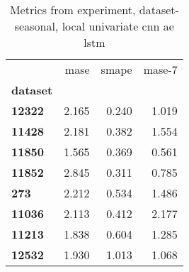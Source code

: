 \begin{table}[h]
\centering
\caption{Metrics from experiment, dataset-seasonal, local univariate cnn ae lstm}
\label{table:local-univariate-cnn-ae-lstm-dataset-seasonal}
\begin{tabular}{lrrr}
\toprule
{} &   mase &  smape &  mase-7 \\
\textbf{dataset} &        &        &         \\
\midrule
\textbf{12322  } &  2.165 &  0.240 &   1.019 \\
\textbf{11428  } &  2.181 &  0.382 &   1.554 \\
\textbf{11850  } &  1.565 &  0.369 &   0.561 \\
\textbf{11852  } &  2.845 &  0.311 &   0.785 \\
\textbf{273    } &  2.212 &  0.534 &   1.486 \\
\textbf{11036  } &  2.113 &  0.412 &   2.177 \\
\textbf{11213  } &  1.838 &  0.604 &   1.285 \\
\textbf{12532  } &  1.930 &  1.013 &   1.068 \\
\bottomrule
\end{tabular}
\end{table}
